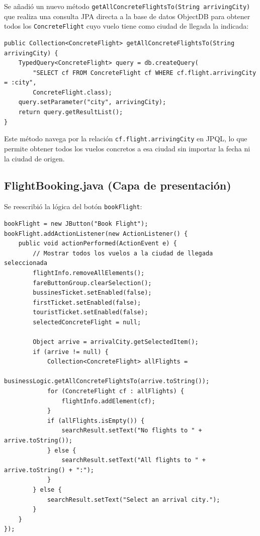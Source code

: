 \documentclass[12pt,a4paper]{article}
\begin{document}
Se añadió un nuevo método \texttt{getAllConcreteFlightsTo(String arrivingCity)} que realiza una consulta JPA directa a la base de datos ObjectDB para obtener todos los \texttt{ConcreteFlight} cuyo vuelo tiene como ciudad de llegada la indicada:

\begin{lstlisting}
public Collection<ConcreteFlight> getAllConcreteFlightsTo(String arrivingCity) {
    TypedQuery<ConcreteFlight> query = db.createQuery(
        "SELECT cf FROM ConcreteFlight cf WHERE cf.flight.arrivingCity = :city",
        ConcreteFlight.class);
    query.setParameter("city", arrivingCity);
    return query.getResultList();
}
\end{lstlisting}

Este método navega por la relación \texttt{cf.flight.arrivingCity} en JPQL, lo que permite obtener todos los vuelos concretos a esa ciudad sin importar la fecha ni la ciudad de origen.

\subsection{FlightBooking.java (Capa de presentación)}

Se reescribió la lógica del botón \texttt{bookFlight}:

\begin{lstlisting}
bookFlight = new JButton("Book Flight");
bookFlight.addActionListener(new ActionListener() {
    public void actionPerformed(ActionEvent e) {
        // Mostrar todos los vuelos a la ciudad de llegada seleccionada
        flightInfo.removeAllElements();
        fareButtonGroup.clearSelection();
        bussinesTicket.setEnabled(false);
        firstTicket.setEnabled(false);
        touristTicket.setEnabled(false);
        selectedConcreteFlight = null;

        Object arrive = arrivalCity.getSelectedItem();
        if (arrive != null) {
            Collection<ConcreteFlight> allFlights =
                businessLogic.getAllConcreteFlightsTo(arrive.toString());
            for (ConcreteFlight cf : allFlights) {
                flightInfo.addElement(cf);
            }
            if (allFlights.isEmpty()) {
                searchResult.setText("No flights to " + arrive.toString());
            } else {
                searchResult.setText("All flights to " + arrive.toString() + ":");
            }
        } else {
            searchResult.setText("Select an arrival city.");
        }
    }
});
\end{lstlisting}
\end{document}

